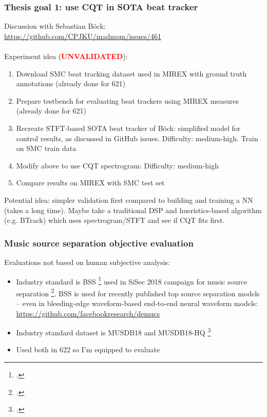 \documentclass[usenames,dvipsnames]{beamer}
\begin{document}
\begin{frame}
	\frametitle{Thesis goal 1: use CQT in SOTA beat tracker}
	Discussion with Sebastian B{\"o}ck:
	\href{https://github.com/CPJKU/madmom/issues/461}{https://github.com/CPJKU/madmom/issues/461}\\\ \\
	Experiment idea (\textcolor{red}{\textbf{UNVALIDATED}}):
	\begin{enumerate}
		\item
			Download SMC beat tracking dataset used in MIREX with ground truth annotations (already done for 621)
		\item
			Prepare testbench for evaluating beat trackers using MIREX measures (already done for 621)
		\item
			Recreate STFT-based SOTA beat tracker of B{\"o}ck: simplified model for control results, as discussed in GitHub issues. Difficulty: medium-high. Train on SMC train data
		\item
			Modify above to use CQT spectrogram: Difficulty: medium-high
		\item
			Compare results on MIREX with SMC test set
	\end{enumerate}
	Potential idea: simpler validation first compared to building and training a NN (takes a long time). Maybe take a traditional DSP and hueristics-based algorithm (e.g. BTrack) which uses spectrogram/STFT and see if CQT fits first.
\end{frame}

\begin{frame}
	\frametitle{Music source separation objective evaluation}
	Evaluations not based on human subjective analysis:
	\begin{itemize}
		\item
			Industry standard is BSS \footcite{bss} used in SiSec 2018 campaign for music source separation \footcite{sigsep2018}. BSS is used for recently published top source separation models -- even in bleeding-edge waveform-based end-to-end neural waveform models: \href{https://github.com/facebookresearch/demucs}{https://github.com/facebookresearch/demucs}
		\item
			Industry standard dataset is MUSDB18 and MUSDB18-HQ \footcite{musdb18, musdb18-hq}
		\item
			Used both in 622 so I'm equipped to evaluate
	\end{itemize}
\end{frame}
\end{document}
